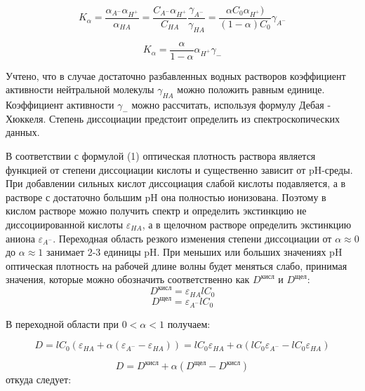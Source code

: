 \documentclass[a4paper,12pt]{article}
\begin{document}
\begin{equation}
    K_\alpha = \frac{\alpha_{A^-}\alpha_{H^+}}{\alpha_{HA}} = \frac{C_{A^-}\alpha_{H^+}}{C_{HA}}\frac{\gamma_{A^-}}{\gamma_{HA}} = \frac{\alpha C_0\alpha_{H^+})}{(1-\alpha)C_0}\gamma_{A^-}
    \nonumber
\end{equation}

\begin{equation}
    K_\alpha = \frac{\alpha}{1 - \alpha}\alpha_{H^+}\gamma_-
\end{equation}

Учтено, что в случае достаточно разбавленных водных растворов коэффициент
активности нейтральной молекулы $\gamma_{HA}$ можно положить равным единице. Коэффициент
активности $\gamma_{-}$ можно рассчитать, используя формулу Дебая - Хюккеля. Степень
диссоциации предстоит определить из спектроскопических данных.

В соответствии с формулой (1) оптическая плотность раствора является функцией от степени диссоциации кислоты и
существенно зависит от pH-среды. При добавлении сильных кислот диссоциация слабой
кислоты подавляется, а в растворе с достаточно большим pH она полностью ионизована.
Поэтому в кислом растворе можно получить спектр и определить экстинкцию не
диссоциированной кислоты $\varepsilon_{HA}$, а в щелочном растворе определить экстинкцию аниона $\varepsilon_{A^-}$. Переходная область резкого изменения степени диссоциации от $\alpha \approx 0$ до $\alpha \approx 1$ занимает 2-3 единицы pH. При меньших или больших значениях pH оптическая плотность
на рабочей длине волны будет меняться слабо, принимая значения, которые можно
обозначить соответственно как $D^{\text{кисл}}$ и $D^{\text{щел}}$:
\begin{equation}
    D^{\text{кисл}} = \varepsilon_{HA}lC_0
    \nonumber
\end{equation}
\begin{equation}
    D^{\text{щел}} = \varepsilon_{A^-}lC_0
    \nonumber
\end{equation}

В переходной области при $0 < \alpha < 1$ получаем:

\begin{equation}
    D = lC_0(\varepsilon_{HA} + \alpha(\varepsilon_{A^-} - \varepsilon_{HA})) = lC_0\varepsilon_{HA} + \alpha(lC_0\varepsilon_{A^-} - lC_0\varepsilon_{HA})
    \nonumber
\end{equation}

\begin{equation}
    D = D^{\text{кисл}} + \alpha(D^{\text{щел}} - D^{\text{кисл}})
    \nonumber
\end{equation}
откуда следует:
\end{document}
